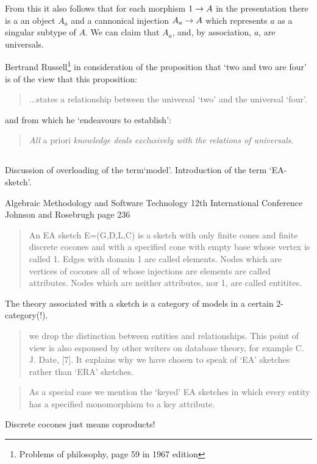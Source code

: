 \documentclass[11pt,a4paper]{scrartcl}
\begin{document}
From this it also follows that for each  morphism $1 \rightarrow A$ in the presentation there is a an object
$A_a$ and a cannonical injection $A_a \rightarrow A$ which represents $a$ as a singular subtype of $A$. We can claim that
$A_a$, and, by association, $a$, are universals. 

Bertrand Russell\footnote{Problems of philosophy, page 59 in 1967 edition} in consideration of the proposition
that `two and two are four' is of the view that this proposition:
\begin{quote}
...states a relationship between the universal `two' and the universal `four'.
\end{quote}
and from which he `endeavours to establish':
\begin{quote}
\textit{All} a priori \textit{knowledge deals exclusively with the relations of universals.}
\end{quote}

\subsection{\cite{johnson2002REL} }

\subsection{\cite{Johnson2002ERA} }
Discussion of overloading of the term`model'.
Introduction of the term `EA-sketch'. 


Algebraic Methodology and Software Technology 12th International Conference Johnson and Rosebrugh page 236
\begin{quote}
An EA sketch E=(G,D,L,C) is a sketch with only finite cones and finite discrete cocones and with a 
specified cone with empty base whose vertex is called 1. Edges with domain 1 are called elements. 
Nodes which are vertices of cocones all of whose injections are elements are called attributes. 
Nodes which are neither attributes, nor 1, are called entitites.
\end{quote}
The theory associated with a sketch is a category of models in a certain 2-category(!).
\begin{quote}
we drop the distinction between entities and relationships. This point of view is also
espoused by other writers on database theory, for example C. J. Date, [7]. It explains
why we have chosen to speak of `EA' sketches rather than `ERA' sketches.
\end{quote}
\begin{quote}
As a special case we mention the `keyed' EA sketches in which every entity has
a specified monomorphism to a key attribute.
\end{quote}
Discrete cocones just means coproducts!
\end{document}
